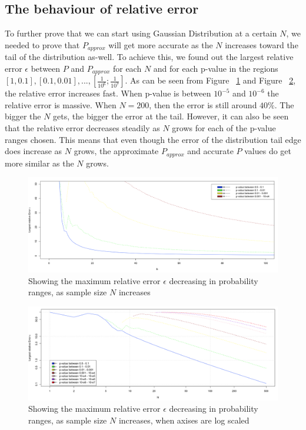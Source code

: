 \documentclass[12pt]{article}
\begin{document}
{\subsection{The behaviour of relative error}
To further prove that we can start using Gaussian Distribution at a certain $N$, we needed to prove that $P_{approx}$ will get more accurate as the $N$ increases toward the tail of the distribution as-well. To achieve this, we found out the largest relative error $\epsilon$ between $P$ and $P_{approx}$ for each $N$ and for each p-value in the regions $[1, 0.1], [0.1, 0.01], ... , [\frac{1}{10^{6}};\frac{1}{10^{7}}]$. As can be seen from Figure ~\ref{fig:LargestApproxPRelativeError0_100} and Figure ~\ref{fig:LargestApproxPRelativeError100_500}, the relative error increases fast. When p-value is between $10^{-5}$ and $10^{-6}$ the relative error is massive. When $N=200$, then the error is still around $40\%$. The bigger the $N$ gets, the bigger the error at the tail. However, it can also be seen that the relative error decreases steadily as $N$ grows for each of the p-value ranges chosen. This means that even though the error of the distribution tail edge does increase as $N$ grows, the approximate $P_{approx}$ and accurate $P$ values do get more similar as the $N$ grows.

\begin{figure}[H]
  \centering
  \includegraphics[width=1\textwidth]{LargestApproxPRelativeError0_100}
  \caption{Showing the maximum relative error $\epsilon$ decreasing in probability ranges, as sample size $N$ increases}
  \label{fig:LargestApproxPRelativeError0_100}
\end{figure}

\begin{figure}[H]
  \centering
  \includegraphics[width=1\textwidth]{LargestApproxPRelativeError100_500}
  \caption{Showing the maximum relative error $\epsilon$ decreasing in probability ranges, as sample size $N$ increases, when axises are log scaled}
  \label{fig:LargestApproxPRelativeError100_500}
\end{figure}

}
\end{document}
